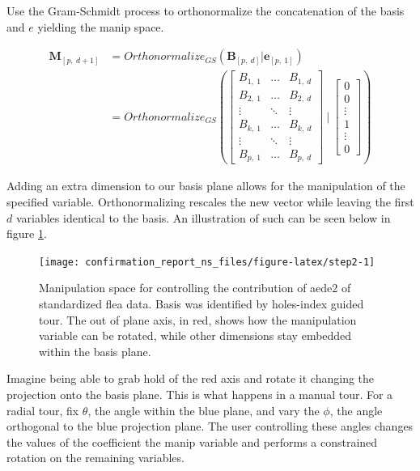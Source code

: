 \documentclass{monashthesis}
\begin{document}
Use the Gram-Schmidt process to orthonormalize the concatenation of the
basis and \(e\) yielding the manip space.

\begin{align*}
  \textbf{M}_{[p,~d+1]}
  &= Orthonormalize_{GS}( \textbf{B}_{[p,~d]}|\textbf{e}_{[p,~1]} ) \\
  &= Orthonormalize_{GS}
  \left(
    \begin{bmatrix}
      B_{1,~1} & \dots  & B_{1,~d} \\
      B_{2,~1} & \dots  & B_{2,~d} \\
      \vdots   & \ddots & \vdots   \\
      B_{k,~1} & \dots  & B_{k,~d} \\
      \vdots   & \ddots & \vdots   \\
      B_{p,~1} & \dots  & B_{p,~d}
    \end{bmatrix}
  ~|~
    \begin{bmatrix}
      0 \\
      0 \\
      \vdots \\
      1 \\
      \vdots \\
      0
    \end{bmatrix}
  \right)
\end{align*}

Adding an extra dimension to our basis plane allows for the manipulation
of the specified variable. Orthonormalizing rescales the new vector
while leaving the first \(d\) variables identical to the basis. An
illustration of such can be seen below in figure \ref{fig:step2}.

\begin{figure}

{\centering \texttt{[image: confirmation\_report\_ns\_files/figure-latex/step2-1]} 

}

\caption{Manipulation space for controlling the contribution of aede2 of standardized flea data. Basis was identified by holes-index guided tour. The out of plane axis, in red, shows how the manipulation variable can be rotated, while other dimensions stay embedded within the basis plane.}\label{fig:step2}
\end{figure}

Imagine being able to grab hold of the red axis and rotate it changing
the projection onto the basis plane. This is what happens in a manual
tour. For a radial tour, fix \(\theta\), the angle within the blue
plane, and vary the \(\phi\), the angle orthogonal to the blue
projection plane. The user controlling these angles changes the values
of the coefficient the manip variable and performs a constrained
rotation on the remaining variables.
\end{document}
